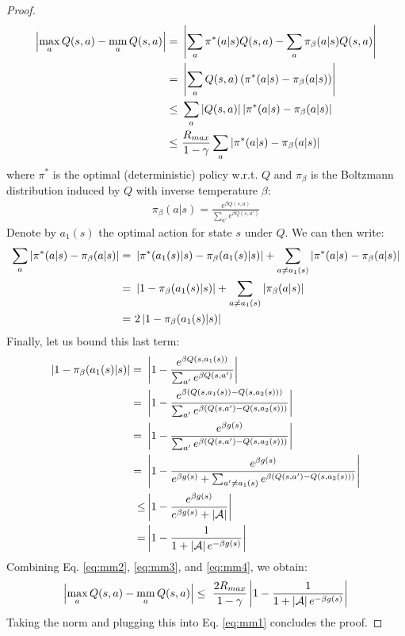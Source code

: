\documentclass{article}
\newcommand{\mm}{\operatornamewithlimits{mm}}
\newcommand{\abs}[1]{\left\lvert #1 \right\rvert}
\begin{document}
\begin{proof}
\begin{align} \label{eq:mm2}
\abs{\max_a Q(s,a) - \mm_a Q(s,a)} =\ & \abs{\sum_a \pi^*(a|s)Q(s,a) - \sum_a \pi_{\beta}(a|s)Q(s,a)}\notag\\ =\ & \abs{\sum_a Q(s,a) \left( \pi^*(a|s) - \pi_{\beta}(a|s)  \right)}\notag\\ \leq\ & \sum_a \abs{Q(s,a)} \abs{\pi^*(a|s) - \pi_{\beta}(a|s)}\notag\\ \leq\ & \frac{R_{max}}{1-\gamma}\sum_a\abs{\pi^*(a|s) - \pi_{\beta}(a|s)}
\end{align}
where $\pi^*$ is the optimal (deterministic) policy w.r.t. $Q$ and $\pi_{\beta}$ is the Boltzmann distribution induced by $Q$ with inverse temperature $\beta$:
\begin{align*}
\pi_{\beta}(a|s) = \frac{e^{\beta Q(s,a)}}{\sum_{a'}e^{\beta Q(s,a')}}
\end{align*}
Denote by $a_1(s)$ the optimal action for state $s$ under $Q$. We can then write:
\begin{align} \label{eq:mm3}
\sum_a\abs{\pi^*(a|s) - \pi_{\beta}(a|s)} =\ & \abs{\pi^*(a_1(s)|s) - \pi_{\beta}(a_1(s)|s)} + \sum_{a \neq a_1(s)}\abs{\pi^*(a|s) - \pi_{\beta}(a|s)}\notag\\ =\ & \abs{1 - \pi_{\beta}(a_1(s)|s)} + \sum_{a \neq a_1(s)}\abs{\pi_{\beta}(a|s)}\notag\\ =\ & 2\abs{1 - \pi_{\beta}(a_1(s)|s)}
\end{align}
Finally, let us bound this last term:
\begin{align} \label{eq:mm4}
\abs{1 - \pi_{\beta}(a_1(s)|s)} =\ & \abs{1 - \frac{e^{\beta Q(s,a_1(s))}}{\sum_{a'}e^{\beta Q(s,a')}}}\notag\\ =\ & \abs{1 - \frac{e^{\beta \left( Q(s,a_1(s)) - Q(s,a_2(s)) \right)}}{\sum_{a'}e^{\beta \left( Q(s,a') - Q(s,a_2(s))\right)}}}\notag\\ =\ & \abs{1 - \frac{e^{\beta g(s)}}{\sum_{a'}e^{\beta \left( Q(s,a') - Q(s,a_2(s))\right)}}}\notag\\ =\ & \abs{1 - \frac{e^{\beta g(s)}}{e^{\beta g(s)} + \sum_{a' \neq a_1(s)}e^{\beta \left( Q(s,a') - Q(s,a_2(s))\right)}}}\notag\\ \leq & \abs{1 - \frac{e^{\beta g(s)}}{e^{\beta g(s)} + \abs{\mathcal{A}}}}\notag\\ = & \abs{1 - \frac{1}{1 + \abs{\mathcal{A}}e^{-\beta g(s)}}}
\end{align}
Combining Eq. \eqref{eq:mm2}, \eqref{eq:mm3}, and \eqref{eq:mm4}, we obtain:
\begin{align*}
\abs{\max_a Q(s,a) - \mm_a Q(s,a)} \leq\ \frac{2R_{max}}{1-\gamma}\abs{1 - \frac{1}{1 + \abs{\mathcal{A}}e^{-\beta g(s)}}}
\end{align*}
Taking the norm and plugging this into Eq. \eqref{eq:mm1} concludes the proof.
\end{proof}
\end{document}
